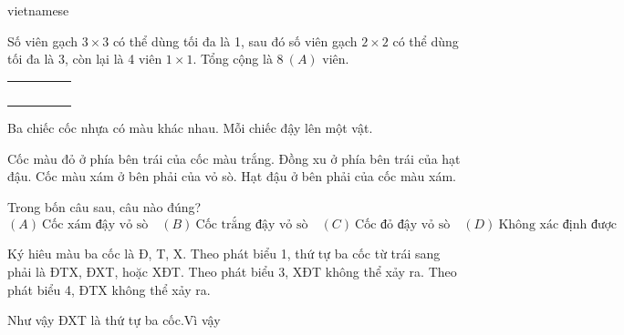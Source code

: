 \documentclass{article}
\begin{document}
\begin{otherlanguage*}{vietnamese}
\begin{soln}
    Số viên gạch $3 \times 3$ có thể dùng tối đa là 1, sau đó số viên gạch $2 \times 2$ có thể dùng tối đa là 3, còn lại là 4 viên $1 \times 1.$
    Tổng cộng là $\boxed{8\ (A)}$ viên.

    \begin{center}
        \begin{tabular}{|lll|ll|}
        \hline
         &                       &  &                       &  \\
         &                       &  &                       &  \\ \cline{4-5} 
         &                       &  &                       &  \\ \cline{1-3}
         & \multicolumn{1}{l|}{} &  &                       &  \\ \cline{3-5} 
         & \multicolumn{1}{l|}{} &  & \multicolumn{1}{l|}{} &  \\ \hline
        \end{tabular}
    \end{center}
\end{soln}

\bigbreak

\begin{problem*}[PI-2024-C-P12]
    \label{problem:pi-2024-c-p12}

    Ba chiếc cốc nhựa có màu khác nhau. Mỗi chiếc đậy lên một vật.

    \begin{enumerate}[topsep=0pt, partopsep=0pt, itemsep=0pt]
        \ii Cốc màu đỏ ở phía bên trái của cốc màu trắng.
        \ii Đồng xu ở phía bên trái của hạt đậu.
        \ii Cốc màu xám ở bên phải của vỏ sò.
        \ii Hạt đậu ở bên phải của cốc màu xám.
    \end{enumerate}

    Trong bốn câu sau, câu nào đúng? 
    \[
        (A) \ \text{Cốc xám đậy vỏ sò} \quad
        (B) \ \text{Cốc trắng đậy vỏ sò} \quad
        (C) \ \text{Cốc đỏ đậy vỏ sò} \quad
        (D) \ \text{Không xác định được} \quad
    \]
\end{problem*}

\begin{soln}
    Ký hiêu màu ba cốc là Đ, T, X. Theo phát biểu 1, thứ tự ba cốc từ trái sang phải là ĐTX, ĐXT, hoặc XĐT.
    Theo phát biểu 3, XĐT không thể xảy ra.
    Theo phát biểu 4, ĐTX không thể xảy ra. 

    Như vậy ĐXT là thứ tự ba cốc.Vì vậy 
\end{soln}


\end{otherlanguage*}
\end{document}
